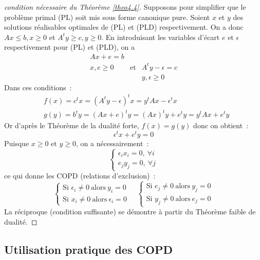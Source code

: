 \documentclass[a4paper,12pt,openany]{book}
\theoremstyle{plain}
\theoremstyle{definition}
\theoremstyle{remark}
\theoremstyle{nbstyle}
\begin{document}
	\begin{proof}[condition nécessaire du Théorème \ref{theo4.4}]
		Supposons pour simplifier que le problème primal (PL) soit mis sous forme canonique pure. Soient $x$ et $y$ des solutions réalisables optimales de (PL) et (PLD) respectivement. On a donc $A x \leq b, x \geq 0$ et $A^{t} y \geq c, y \geq 0$. En introduisant les variables d'écart $e$ et $\epsilon$ respectivement pour (PL) et (PLD), on a
		\[
		\begin{array}{ccc}
		A x + e = b & \\
		x, e \geq 0 & \text{et} & A^{t} y - \epsilon = c \\
		& & y, \epsilon \geq 0
		\end{array}
		\]
		Dans ces conditions~:
		\[
		\begin{aligned}
		& f(x) = c^{t} x = \left(A^{t} y - \epsilon\right)^{t} x = y^{t} A x - \epsilon^{t} x \\
		& g(y) = b^{t} y = (A x + e)^{t} y = (A x)^{t} y + e^{t} y = y^{t} A x + e^{t} y
		\end{aligned}
		\]
		Or d'après le Théorème de la dualité forte, $f(x) = g(y)$ donc on obtient~:
		\[
		\epsilon^{t} x + e^{t} y = 0
		\]
		Puisque $x \geq 0$ et $y \geq 0$, on a nécessairement~:
		\[
		\left\{
		\begin{array}{l}
		\epsilon_{i} x_{i} = 0, \ \forall i \\
		e_{j} y_{j} = 0, \ \forall j
		\end{array}
		\right.
		\]
		ce qui donne les COPD (relations d'exclusion)~:
		\[
		\left\{
		\begin{array}{l}
		\text{Si } \epsilon_{i} \neq 0 \ \text{alors} \ y_{i} = 0 \\
		\text{Si } x_{i} \neq 0 \ \text{alors} \ \epsilon_{i} = 0
		\end{array}
		\right.
		\quad
		\left\{
		\begin{array}{l}
		\text{Si } e_{j} \neq 0 \ \text{alors} \ y_{j} = 0 \\
		\text{Si } y_{j} \neq 0 \ \text{alors} \ e_{j} = 0
		\end{array}
		\right.
		\]
		La réciproque (condition suffisante) se démontre à partir du Théorème faible de dualité.
	\end{proof}
	
	\subsection{Utilisation pratique des COPD}
	
\end{document}
